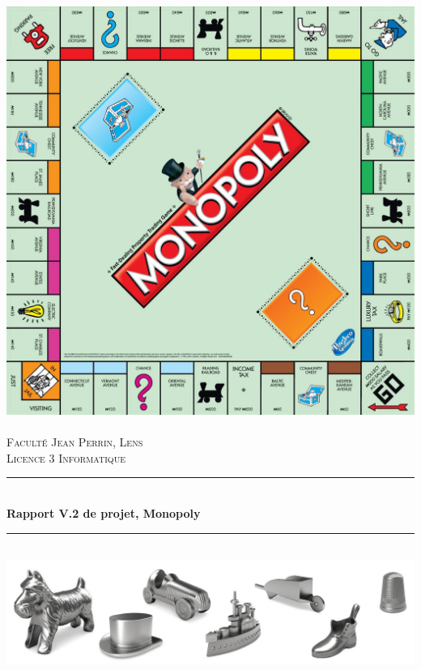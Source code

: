 \documentclass[12pt, openany]{report}
\newcommand{\HRule}{\rule{\linewidth}{0.5mm}}
\begin{document}
\begin{titlepage}
  \begin{sffamily}
  \begin{center}

    \includegraphics[scale=0.1]{monop.jpg}~\\[1.5cm]

    \textsc{\LARGE Faculté Jean Perrin, Lens}\\[2cm]

    \textsc{\Large Licence 3 Informatique}\\[1.5cm]

    \HRule \\[0.4cm]
    { \huge \bfseries Rapport V.2 de projet, Monopoly\\[0.4cm] }

    \HRule \\[2cm]
    \includegraphics[scale=0.3]{pions.jpg}
    \\[2cm]


\end{center}
\end{sffamily}
\end{titlepage}
\end{document}
